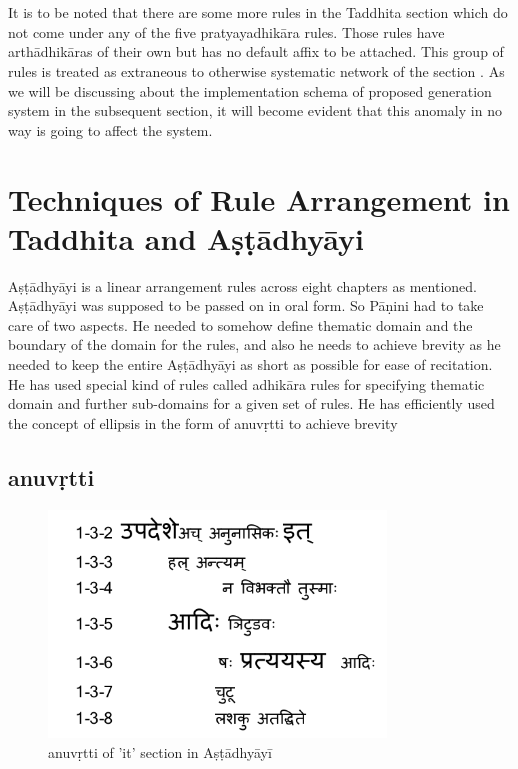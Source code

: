 \documentclass[a4paper,11pt,twoside,openright]{report}
\begin{document}
\\ \\
It is to be noted that there are some more rules in the Taddhita section which do not come under any of the five pratyayadhikāra rules. Those rules have arthādhikāras of their own but has no default affix to be attached. This group of rules is treated as extraneous to otherwise systematic network of the section \cite{bhate89}. As we will be discussing about the implementation schema of proposed generation system in the subsequent section, it will become evident that this anomaly in no way is going to affect the system.


\section{Techniques of Rule Arrangement in Taddhita and Aṣṭādhyāyi}

Aṣṭādhyāyi is a linear arrangement rules across eight chapters as mentioned. Aṣṭādhyāyi
was supposed to be passed on in oral form. So Pāṇini had to take care of two aspects. He
needed to somehow define thematic domain and the boundary of the domain for the
rules, and also he needs to achieve brevity as he needed to keep the entire Aṣṭādhyāyi as
short as possible for ease of recitation. He has used special kind of rules called adhikāra rules
for specifying thematic domain and further sub-domains for a given set of rules. He has
efficiently used the concept of ellipsis in the form of anuvṛtti to achieve brevity

\subsection{anuvṛtti}

\begin{figure}[h]
    \centering
	\includegraphics[width=0.8\textwidth]{anuIn}
    \caption{anuvṛtti of 'it' section in Aṣṭādhyāyī}
    \label{fig:anuFig}
\end{figure}
\end{document}
